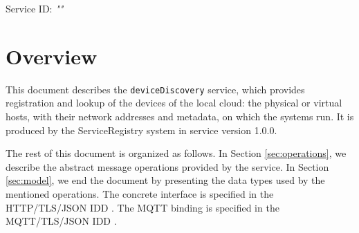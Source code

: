 \documentclass[a4paper]{arrowhead}
\begin{document}
\sloppy

\ArrowheadSetup

\begin{center}
  \vspace*{1cm}
  \huge{\arrowtitle}

  \vspace*{0.2cm}
  \LARGE{\arrowtype}
  \vspace*{1cm}

  \Large{Service ID: \textit{"\arrowid"}}

  \vspace*{\fill}


  \vspace*{1cm}
  \vspace*{\fill}

  \begin{abstract}
    This document describes the \texttt{deviceDiscovery} service, version 1.0.0, produced by the ServiceRegistry core system of Arrowhead 5.2.2.
  \end{abstract}

  \vspace*{1cm}
\end{center}

\newpage

\tableofcontents
\newpage

\section{Overview}
\label{sec:overview}

This document describes the \texttt{deviceDiscovery} service, which provides registration and lookup of the devices of the local cloud: the physical or virtual hosts, with their network addresses and metadata, on which the systems run.
It is produced by the ServiceRegistry system \cite{sr-sysd} in service version 1.0.0.

The rest of this document is organized as follows.
In Section \ref{sec:operations}, we describe the abstract message operations provided by the service.
In Section \ref{sec:model}, we end the document by presenting the data types used by the mentioned operations.
The concrete interface is specified in the HTTP/TLS/JSON IDD \cite{sr-deviceDiscovery-http-idd}. The MQTT binding is specified in the MQTT/TLS/JSON IDD \cite{sr-deviceDiscovery-mqtt-idd}.
\end{document}
